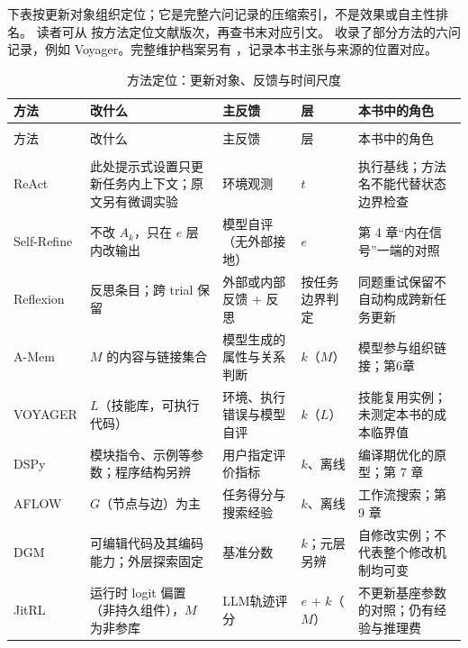 \begin{sloppypar}
下表按更新对象组织定位；它是完整六问记录的压缩索引，不是效果或自主性排名。
读者可从  按方法定位文献版次，再查书末对应引文。 收录了部分方法的六问记录，例如 Voyager。完整维护档案另有 ，记录本书主张与来源的位置对应。
\end{sloppypar}

\begingroup
\footnotesize
\begin{longtable}{>{\raggedright\arraybackslash}p{2.9cm}>{\raggedright\arraybackslash}p{2.4cm}>{\raggedright\arraybackslash}p{1.9cm}>{\raggedright\arraybackslash}p{1.5cm}>{\raggedright\arraybackslash}p{3.9cm}}
\caption{方法定位：更新对象、反馈与时间尺度}\label{tab:appE-methods}\\
\toprule
方法 & 改什么 & 主反馈 & 层 & 本书中的角色 \\
\midrule
\endfirsthead
\multicolumn{5}{l}{\tablename\ \thetable（续）}\\
\toprule
方法 & 改什么 & 主反馈 & 层 & 本书中的角色 \\
\midrule
\endhead
\midrule
\multicolumn{5}{r}{续下页}\\
\endfoot
\bottomrule
\endlastfoot
ReAct\cite{react-2210} & 此处提示式设置只更新任务内上下文；原文另有微调实验 & 环境观测 & $t$ & 执行基线；方法名不能代替状态边界检查 \\
Self-Refine\cite{self-refine-2303} & 不改 $A_k$，只在 $e$ 层内改输出 & 模型自评（无外部接地） & $e$ & 第 4 章“内在信号”一端的对照 \\
Reflexion\cite{reflexion-2303} & 反思条目；跨 trial 保留 & 外部或内部反馈 + 反思 & 按任务边界判定 & 同题重试保留不自动构成跨新任务更新 \\
A-Mem\cite{amem-2502} & $M$ 的内容与链接集合 & 模型生成的属性与关系判断 & $k$（$M$） & 模型参与组织链接；第6章 \\
VOYAGER\cite{voyager-2305} & $L$（技能库，可执行代码） & 环境、执行错误与模型自评 & $k$（$L$） & 技能复用实例；未测定本书的成本临界值 \\
DSPy\cite{dspy-2310} & 模块指令、示例等参数；程序结构另辨 & 用户指定评价指标 & $k$、离线 & 编译期优化的原型；第 7 章 \\
AFLOW\cite{aflow-2410} & $G$（节点与边）为主 & 任务得分与搜索经验 & $k$、离线 & 工作流搜索；第 9 章 \\
DGM\cite{dgm-2505} & 可编辑代码及其编码能力；外层探索固定 & 基准分数 & $k$；元层另辨 & 自修改实例；不代表整个修改机制均可变 \\
JitRL\cite{jitrl-2601} & 运行时 logit 偏置（非持久组件），$M$ 为非参库 & LLM轨迹评分 & $e$ + $k$（$M$） & 不更新基座参数的对照；仍有经验与推理费 \\

\end{longtable}

